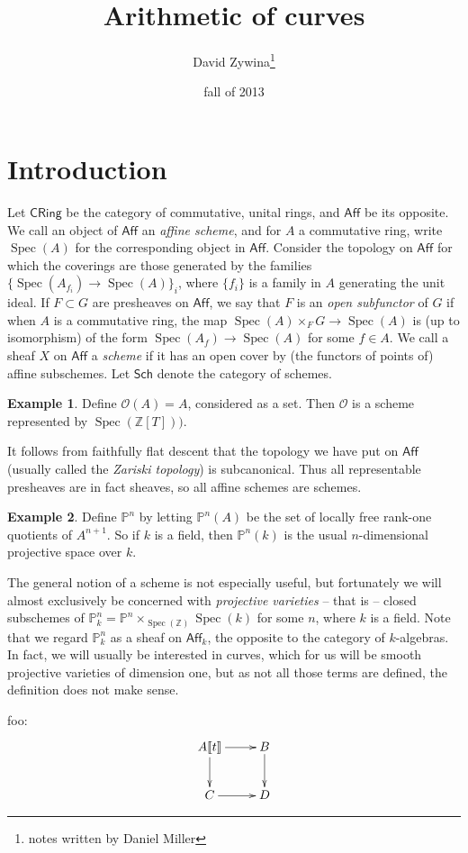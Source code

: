 \documentclass{article}
\title{Arithmetic of curves}
\author{David Zywina\thanks{notes written by Daniel Miller}}
\date{fall of 2013}
\DeclareMathOperator{\spec}{Spec}
\theoremstyle{definition}
\newtheorem{example}{Example}
\begin{document}
\maketitle










\section{Introduction}





Let $\mathsf{CRing}$ be the category of commutative, unital rings, and 
$\mathsf{Aff}$ be its opposite. We call an object of $\mathsf{Aff}$ an 
\emph{affine scheme}, and for $A$ a commutative ring, write $\spec(A)$ for the 
corresponding object in $\mathsf{Aff}$. Consider the topology on 
$\mathsf{Aff}$ for which the coverings are those generated by the families 
$\{\spec(A_{f_i})\to \spec(A)\}_i$, where $\{f_i\}$ is a family in $A$ 
generating the unit ideal. If $F\subset G$ are presheaves on $\mathsf{Aff}$, 
we say that $F$ is an \emph{open subfunctor} of $G$ if when $A$ is a 
commutative ring, the map $\spec(A)\times_F G\to \spec(A)$ is (up to 
isomorphism) of the form $\spec(A_f)\to \spec(A)$ for some $f\in A$. We call 
a sheaf $X$ on $\mathsf{Aff}$ a \emph{scheme} if it has an open cover by 
(the functors of points of) affine subschemes. Let $\mathsf{Sch}$ denote 
the category of schemes. 

\begin{example}
Define $\mathcal{O}(A)=A$, considered as a set. Then $\mathcal{O}$ is a scheme 
represented by $\spec(\mathbb{Z}[T]))$. 
\end{example}

It follows from faithfully flat descent that the topology we have put on 
$\mathsf{Aff}$ (usually called the \emph{Zariski topology}) is subcanonical. 
Thus all representable presheaves are in fact sheaves, so all affine schemes 
are schemes. 

\begin{example}
Define $\mathbb{P}^n$ by letting $\mathbb{P}^n(A)$ be the set of locally 
free rank-one quotients of $A^{n+1}$. So if $k$ is a field, then 
$\mathbb{P}^n(k)$ is the usual $n$-dimensional projective space over $k$. 
\end{example}

The general notion of a scheme is not especially useful, but fortunately we 
will almost exclusively be concerned with \emph{projective varieties} -- that 
is -- closed subschemes of 
$\mathbb{P}_k^n=\mathbb{P}^n\times_{\spec(\mathbb{Z})}\spec(k)$ for some $n$, 
where $k$ is a field. Note that we regard $\mathbb{P}_k^n$ as a sheaf on 
$\mathsf{Aff}_k$, the opposite to the category of $k$-algebras. In fact, we 
will usually be interested in curves, which for us will be smooth projective 
varieties of dimension one, but as not all those terms are defined, the 
definition does not make sense. 

foo:
\[\xymatrix{
  A \llbracket t\rrbracket \ar[r] \ar[d] & B \ar[d] \\
  C \ar[r] & D
}\]
\end{document}
